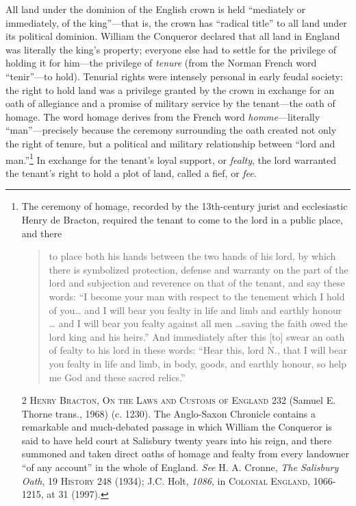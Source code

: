 
All land under the dominion of the English crown is held ``mediately or
immediately, of the king''---that is, the crown has ``radical title'' to all
land under its political dominion. William the Conqueror declared that all land
in England was literally the king's property; everyone else had to settle for
the privilege of holding it for him---the privilege of \textit{tenure} (from
the Norman French word ``tenir''---to hold). Tenurial rights were intensely
personal in early feudal society: the right to hold land was a privilege
granted by the crown in exchange for an oath of allegiance and a promise of
military service by the tenant---the oath of homage. The word homage derives
from the French word \textit{homme}---literally ``man''---precisely because
the ceremony surrounding the oath created not only the right of tenure, but a
political and military relationship between ``lord and man.''\footnote{The
ceremony of homage, recorded by the 13th-century jurist and
ecclesiastic Henry de Bracton, required the tenant to come to the lord in a
public place, and there
\begin{quote}
to place both his hands between the two hands of his
lord, by which there is symbolized protection, defense and warranty on the part
of the lord and subjection and reverence on that of the tenant, and say these
words: ``I become your man with respect to the tenement which I hold of you\dots
and I will bear you fealty in life and limb and earthly honour \dots
and I will bear you fealty against all men \dots saving the faith owed the
lord king and his heirs.'' And immediately after this [to] swear an oath of
fealty to his lord in these words: ``Hear this, lord N., that I will bear you
fealty in life and limb, in body, goods, and earthly honour, so help me God and
these sacred relics.''
\end{quote}
2 \textsc{Henry Bracton}, \textsc{On the Laws and Customs of England} 232
(Samuel E. Thorne trans., 1968) (c. 1230). The Anglo-Saxon Chronicle contains a
remarkable and much-debated passage in which William the Conqueror is said to
have held court at Salisbury twenty years into his reign, and there summoned and
taken direct oaths of homage and fealty from every landowner ``of any account''
in the whole of England. \textit{See} H. A. Cronne, \textit{The Salisbury Oath},
19 \textsc{History} 248 (1934); J.C. Holt, \textit{1086}, in \textsc{Colonial
England, 1066-1215, }at 31 (1997).} In exchange for the tenant's loyal support,
or \textit{fealty}, the lord warranted the tenant's right to hold a plot of
land, called a fief, or \textit{fee}.

